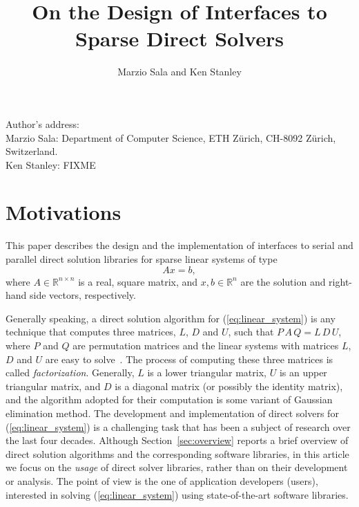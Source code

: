 \documentclass[acmtocl]{acmtrans2m}
\title{On the Design of Interfaces to Sparse Direct Solvers}
\author{Marzio Sala and Ken Stanley}
\begin{document}
\setcounter{page}{1}

\begin{bottomstuff}
Author's address:   \\
Marzio Sala: Department of Computer Science, ETH Z\"urich, CH-8092 Z\"urich,
  Switzerland. \\
Ken Stanley: FIXME
\end{bottomstuff}

\maketitle

\section{Motivations}
\label{sec:introduction}

This paper describes the design and the implementation of 
interfaces to serial and parallel direct solution libraries for
sparse linear systems of type
\begin{equation}
  \label{eq:linear_system}
  A x = b,
\end{equation}
where $A \in \mathbb{R}^{n \times n}$ is a real, square matrix, 
  and $x, b \in \mathbb{R}^{n}$ are the solution and
right-hand side vectors, respectively. 

Generally speaking,
a direct solution algorithm for (\ref{eq:linear_system}) is any 
technique that computes three matrices, $L$, $D$ and $U$, such that
$P\, A\, Q = L \, D \, U$, where $P$ and $Q$ are permutation matrices
and the linear systems with matrices $L$, $D$ and $U$ are
easy to solve~\cite{golub96matrix}. 
The process of computing these three matrices is called {\sl
  factorization}. Generally, $L$ is a lower triangular matrix, $U$ is an
upper triangular matrix, and $D$ is a diagonal matrix 
(or possibly the identity matrix), and the algorithm adopted for their
computation is some variant of Gaussian elimination method.
The development and implementation of
direct solvers for (\ref{eq:linear_system}) is a
challenging task that has been a subject of research over the
last four decades. Although
Section~\ref{sec:overview} reports a brief overview of direct solution algorithms and
the corresponding software libraries, in
this article we focus on the {\sl usage} of direct solver libraries, rather
than on their development or analysis. The point of view is the one
of application developers (users), interested in solving
(\ref{eq:linear_system}) using state-of-the-art software libraries.  
\end{document}
